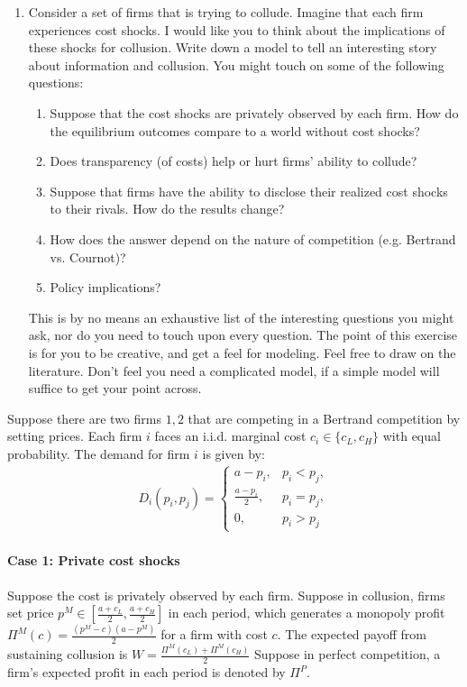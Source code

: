 \documentclass[12pt]{article}
\begin{document}
\begin{enumerate}
\item Consider a set of firms that is trying to collude. Imagine that each firm experiences cost shocks. I would like you to think about the implications of these shocks for collusion. Write down a model to tell an interesting story about information and collusion. You might touch on some of the following questions:
    \begin{enumerate}
        \item Suppose that the cost shocks are privately observed by each firm. How do the equilibrium outcomes compare to a world without cost shocks?
        \item Does transparency (of costs) help or hurt firms’ ability to collude?
        \item Suppose that firms have the ability to disclose their realized cost shocks to their rivals. How do the results change?
        \item How does the answer depend on the nature of competition (e.g. Bertrand vs. Cournot)?
        \item Policy implications?
    \end{enumerate}
    This is by no means an exhaustive list of the interesting questions you might ask, nor do you need to touch upon every question. The point of this exercise is for you to be creative, and get a feel for modeling. Feel free to draw on the literature. Don't feel you need a complicated model, if a simple model will suffice to get your point across.
\end{enumerate}

Suppose there are two firms $1,2$ that are competing in a Bertrand competition by setting prices. Each firm $i$ faces an i.i.d. marginal cost $c_i\in \{c_L,c_H\}$ with equal probability. The demand for firm $i$ is given by:
\begin{equation}
    \begin{aligned}
        D_i(p_i,p_j)=\left\{\begin{matrix}
            a-p_i,& p_i<p_j,\\
            \frac{a-p_i}{2},& p_i=p_j,\\
            0,& p_i>p_j
        \end{matrix}\right.
    \end{aligned}
    \nonumber
\end{equation}

\paragraph{Case 1: Private cost shocks}
Suppose the cost is privately observed by each firm. Suppose in collusion, firms set price $p^M\in\left[\frac{a+c_L}{2},\frac{a+c_H}{2}\right]$ in each period, which generates a monopoly profit $\Pi^M(c)=\frac{(p^M-c)(a-p^M)}{2}$ for a firm with cost $c$. The expected payoff from sustaining collusion is $W=\frac{\Pi^M(c_L)+\Pi^M(c_H)}{2}$  Suppose in perfect competition, a firm's expected profit in each period is denoted by $\Pi^P$.
\end{document}
